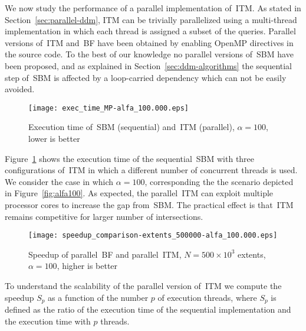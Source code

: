 \documentclass[10pt, conference, compsocconf]{IEEEtran}
\begin{document}
We now study the performance of a parallel implementation of~\ac{ITM}.
As stated in Section~\ref{sec:parallel-ddm}, \ac{ITM} can be trivially
parallelized using a multi-thread implementation in which each
thread is assigned a subset of the queries. Parallel versions
of~\ac{ITM} and~\ac{BF} have been obtained by enabling OpenMP
directives in the source code.  To the best of our knowledge no
parallel versions of~\ac{SBM} have been proposed, and as explained in
Section~\ref{sec:ddm-algorithms} the sequential step of~\ac{SBM} is
affected by a loop-carried dependency which can not be easily avoided.

\begin{figure}[t]
\centering \texttt{[image: exec\_time\_MP-alfa\_100.000.eps]}
\caption{Execution time of~\ac{SBM} (sequential) and~\ac{ITM}
  (parallel), $\alpha=100$, lower is
  better}\label{fig:parallel_comparison_wct}
\end{figure}

Figure~\ref{fig:parallel_comparison_wct} shows the execution time of
the sequential~\ac{SBM} with three configurations of~\ac{ITM} in which
a different number of concurrent threads is used. We consider the case
in which $\alpha=100$, corresponding the the scenario depicted in
Figure~\ref{fig:alfa100}. As expected, the parallel~\ac{ITM} can
exploit multiple processor cores to increase the gap from~\ac{SBM}.
The practical effect is that~\ac{ITM} remains competitive for larger
number of intersections.

\begin{figure}[t]
\centering \texttt{[image: speedup\_comparison-extents\_500000-alfa\_100.000.eps]}
\caption{Speedup of parallel~\ac{BF} and parallel~\ac{ITM}, $N=500 \times 10^3$ extents, $\alpha=100$, higher is better}\label{fig:parallel_comparison_speedup}
\end{figure}

To understand the scalability of the parallel version of~\ac{ITM} we
compute the speedup $S_p$ as a function of the number $p$ of execution
threads, where $S_p$ is defined as the ratio of the execution time of
the sequential implementation and the execution time with $p$ threads.
\end{document}
